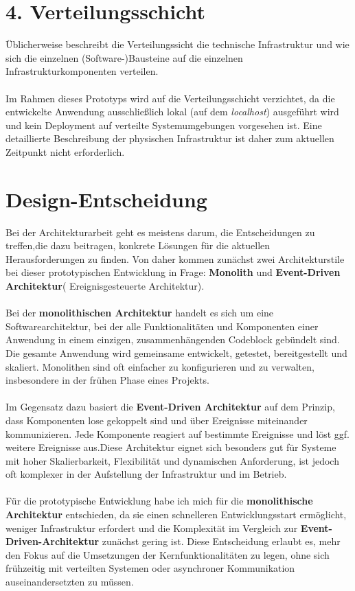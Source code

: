 \documentclass[a4paper,12pt]{scrreprt}
\begin{document}
\section*{\large \textbf{4. Verteilungsschicht}}
Üblicherweise beschreibt die Verteilungssicht die technische Infrastruktur und wie sich die einzelnen (Software-)Bausteine auf die einzelnen Infrastrukturkomponenten verteilen.\\ \\
Im Rahmen dieses Prototyps wird auf die Verteilungsschicht verzichtet, da die entwickelte Anwendung ausschließlich lokal (auf dem \textit{localhost}) ausgeführt wird und kein Deployment auf verteilte Systemumgebungen vorgesehen ist. Eine detaillierte Beschreibung der physischen Infrastruktur ist daher zum aktuellen Zeitpunkt nicht erforderlich.

\clearpage
\section{Design-Entscheidung}
Bei der Architekturarbeit geht es meistens darum, die Entscheidungen zu treffen,die dazu beitragen, konkrete Lösungen für die aktuellen Herausforderungen zu finden. Von daher kommen zunächst zwei Architekturstile bei dieser prototypischen Entwicklung in Frage: \textbf{Monolith} und \textbf{Event-Driven Architektur}( Ereignisgesteuerte Architektur).\\ \\
Bei der \textbf{monolithischen Architektur}  handelt es sich um eine Softwarearchitektur, bei der alle Funktionalitäten und Komponenten einer Anwendung in einem einzigen, zusammenhängenden Codeblock gebündelt sind. Die gesamte Anwendung wird gemeinsame entwickelt, getestet, bereitgestellt und skaliert. Monolithen sind oft einfacher zu konfigurieren und zu verwalten, insbesondere in der frühen Phase eines Projekts. \\ \\
Im Gegensatz dazu basiert die \textbf{Event-Driven Architektur} auf dem Prinzip, dass Komponenten lose gekoppelt sind und über Ereignisse miteinander kommunizieren. Jede Komponente reagiert auf bestimmte Ereignisse und löst ggf. weitere Ereignisse aus.Diese Architektur eignet sich besonders gut für Systeme mit hoher Skalierbarkeit, Flexibilität  und dynamischen Anforderung, ist jedoch oft komplexer in der Aufstellung der Infrastruktur und im Betrieb.\\ \\
Für die prototypische Entwicklung habe ich mich für die \textbf{monolithische Architektur} entschieden, da sie einen schnelleren Entwicklungsstart ermöglicht, weniger Infrastruktur erfordert und die Komplexität im Vergleich zur \textbf{Event-Driven-Architektur} zunächst gering ist. Diese Entscheidung erlaubt es, mehr den Fokus auf die Umsetzungen der Kernfunktionalitäten zu legen, ohne sich frühzeitig mit verteilten Systemen oder asynchroner Kommunikation auseinandersetzten zu müssen. 
	
\end{document}
